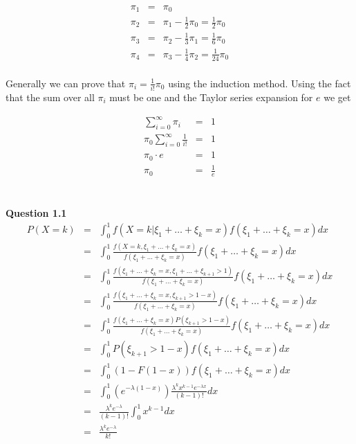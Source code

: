 \documentclass[10pt,a4paper]{article}
\begin{document}
\begin{flushleft}
\begin{eqnarray*}
\pi_1&=& \pi_0 \\
\pi_2&=&\pi_1-\frac{1}{2}\pi_0 = \frac{1}{2}\pi_0\\
\pi_3&=&\pi_2-\frac{1}{3}\pi_1 = \frac{1}{6}\pi_0\\
\pi_4&=&\pi_3-\frac{1}{4}\pi_2 = \frac{1}{24}\pi_0\\
\end{eqnarray*}

Generally we can prove that $\pi_i=\frac{1}{i!}\pi_0$ using the
induction method.  Using the fact that the sum over all $\pi_i$
must be one and the Taylor series expansion for $e$ we get

\begin{eqnarray*}
\sum_{i=0}^{\infty} \pi_{i} &=& 1 \\
\pi_0 \sum_{i=0}^{\infty} \frac{1}{i!} &=& 1 \\
\pi_0 \cdot e &=& 1\\
\pi_0 &=&\frac{1}{e}
\end{eqnarray*}


\begin{eqnarray*}
\\
\end{eqnarray*}


\textbf{Question 1.1}\\
\begin{eqnarray*}
P(X=k)&=&\int_0^1 f(X=k|\xi_1+\ldots+\xi_k=x)f(\xi_1+\ldots+\xi_k=x)dx \\
&=&\int_0^1 \frac{f(X=k,\xi_1+\ldots+\xi_k=x)}{f(\xi_1+\ldots+\xi_k=x)}f(\xi_1+\ldots+\xi_k=x)dx \\
&=&\int_0^1 \frac{f(\xi_1+\ldots+\xi_k=x,\xi_1+\ldots+\xi_{k+1}>1)}{f(\xi_1+\ldots+\xi_k=x)}f(\xi_1+\ldots+\xi_k=x)dx \\
&=&\int_0^1 \frac{f(\xi_1+\ldots+\xi_k=x,\xi_{k+1}>1-x)}{f(\xi_1+\ldots+\xi_k=x)}f(\xi_1+\ldots+\xi_k=x)dx \\
&=&\int_0^1 \frac{f(\xi_1+\ldots+\xi_k=x)P(\xi_{k+1}>1-x)}{f(\xi_1+\ldots+\xi_k=x)}f(\xi_1+\ldots+\xi_k=x)dx \\
&=&\int_0^1 P(\xi_{k+1}>1-x)f(\xi_1+\ldots+\xi_k=x)dx \\
&=&\int_0^1 (1-F(1-x))f(\xi_1+\ldots+\xi_k=x)dx \\
&=&\int_0^1 (e^{-\lambda(1-x)})\frac{\lambda^k x^{k-1} e^{-\lambda x}}{(k-1)!}dx \\
&=&\frac{\lambda^k e^{-\lambda}}{(k-1)!} \int_0^1  x^{k-1} dx \\
&=&\frac{\lambda^k e^{-\lambda}}{k!}\\
\end{eqnarray*}




\end{flushleft}
\end{document}
